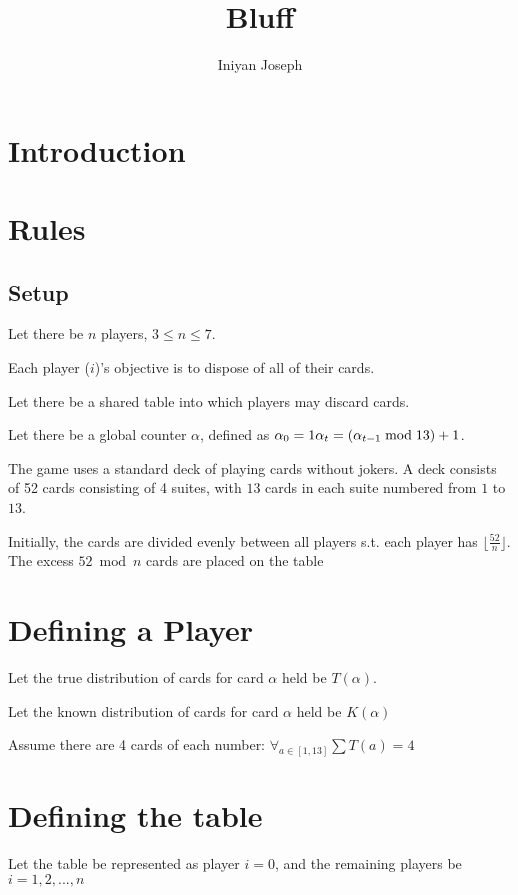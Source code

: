 \documentclass[a4paper,11pt]{article}
\title{Bluff}
\author{Iniyan Joseph}
\begin{document}
\maketitle

\section{Introduction}
\section{Rules}
\begin{description}
    \subsection{Setup}
    \item Let there be $n$ players, $3\leq n\leq 7$.
    \item [Objective] Each player ($i$)'s objective is to dispose of all of their cards.
    \item Let there be a shared table into which players may discard cards.
    \item Let there be a global counter $\alpha$, defined as $\alpha_{0} = 1 \\ \alpha_{t} = (\alpha_{t-1} \bmod 13) + 1$.
    \item The game uses a standard deck of playing cards without jokers. 
    \subitem A deck consists of 52 cards consisting of 4 suites, with $13$ cards in each suite numbered from $1$ to $13$. 
    \item Initially, the cards are divided evenly between all players s.t. each player has $\lfloor\frac{52}{n}\rfloor$. The excess  $52 \bmod n$ cards are placed on the table
    \section{Defining a Player}
    \item Let the true distribution of cards for card $\alpha$ held be $T(\alpha)$. 
    \item Let the known distribution of cards for card $\alpha$ held be $K(\alpha)$
    \item Assume there are 4 cards of each number: $\forall_{a \in [1, 13]}\sum T(a) = 4$
    \section{Defining the table}
    \item Let the table be represented as player $i=0$, and the remaining players be $i=1, 2,..., n$

\end{description}
\end{document}
